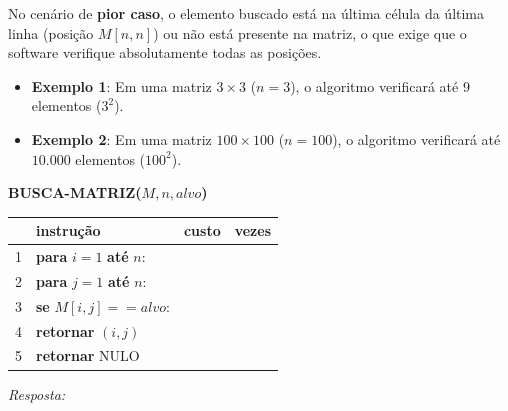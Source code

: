\documentclass[12pt]{article}
\newcommand{\quadro}[1]{\vspace{0.2cm}\begin{tcolorbox}[colback=white, colframe=black, height=#1, boxrule=0.5pt, arc=0pt] \textit{Resposta:} \end{tcolorbox}}
\begin{document}
\begin{enumerate}[label=\arabic*), leftmargin=1.5cm, itemsep=0.8cm]
    No cenário de \textbf{pior caso}, o elemento buscado está na última célula da última linha (posição $M[n,n]$) ou não está presente na matriz, o que exige que o software verifique absolutamente todas as posições.
    
    \begin{itemize}
        \item \textbf{Exemplo 1}: Em uma matriz $3 \times 3$ ($n=3$), o algoritmo verificará até $9$ elementos ($3^2$).
        \item \textbf{Exemplo 2}: Em uma matriz $100 \times 100$ ($n=100$), o algoritmo verificará até $10.000$ elementos ($100^2$).
    \end{itemize}

    \begin{center}
    \end{center}
    \begin{tcolorbox}[colback=white, colframe=black, fontupper=\small]
        \textbf{BUSCA-MATRIZ($M, n, alvo$)} \\
        \begin{tabular}{llcc}
            \hline
            & \textbf{instrução} & \textbf{custo} & \textbf{vezes} \\
            \hline
            1 & \textbf{para} $i = 1$ \textbf{até} $n$: & \underline{\hspace{1cm}} & \underline{\hspace{1cm}} \\
            2 & \quad \textbf{para} $j = 1$ \textbf{até} $n$: & \underline{\hspace{1cm}} & \underline{\hspace{1cm}} \\
            3 & \quad \quad \textbf{se} $M[i,j] == alvo$: & \underline{\hspace{1cm}} & \underline{\hspace{1cm}} \\
            4 & \quad \quad \quad \textbf{retornar} $(i,j)$ & \underline{\hspace{1cm}} & \underline{\hspace{1cm}} \\
            5 & \textbf{retornar} NULO & \underline{\hspace{1cm}} & \underline{\hspace{1cm}} \\
            \hline
        \end{tabular}
    \end{tcolorbox}
    \quadro{2cm}


\end{enumerate}
\end{document}
